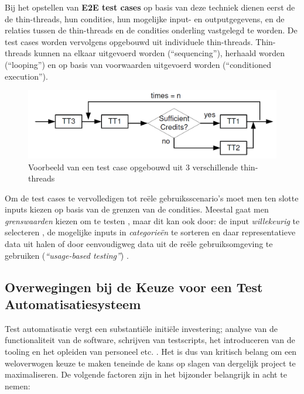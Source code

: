 Bij het opstellen van \textbf{E2E test cases} op basis van deze techniek dienen eerst de de thin-threads, hun condities, hun mogelijke input- en outputgegevens, en de relaties tussen de thin-threads en de condities onderling vastgelegd te worden. De test cases worden vervolgens opgebouwd uit individuele thin-threads. Thin-threads kunnen na elkaar uitgevoerd worden (``sequencing''), herhaald worden (``looping'') en op basis van voorwaarden uitgevoerd worden (``conditioned execution'').

\begin{figure}[h!]
    \centering
    \includegraphics[scale=0.35]{img/Tsai2001ComplexTestScenario.png}
    \caption{Voorbeeld van een test case opgebouwd uit 3 verschillende thin-threads ~\cite{Tsai2001}}
    \label{fig:tsaicomplexscenario}
\end{figure}

Om de test cases te vervolledigen tot reële gebruiksscenario's moet men ten slotte inputs kiezen op basis van de grenzen van de condities. Meestal gaat men \emph{grenswaarden} kiezen om te testen \autocite{Jorgensen2013}, maar dit kan ook door: de input \emph{willekeurig} te selecteren \autocite{Loo1988}, de mogelijke inputs in \emph{categorieën} te sorteren en daar representatieve data uit halen of door eenvoudigweg data uit de reële gebruiksomgeving te gebruiken (\emph{``usage-based testing''}) \autocite{Dyer1992}.

\subsection{Overwegingen bij de Keuze voor een Test Automatisatiesysteem}

Test automatisatie vergt een substantiële initiële investering; analyse van de functionaliteit van de software, schrijven van testscripts, het introduceren van de tooling en het opleiden van personeel etc. \autocite{Kumar2016}. Het is dus van kritisch belang om een weloverwogen keuze te maken teneinde de kans op slagen van dergelijk project te maximaliseren. De volgende factoren zijn in het bijzonder belangrijk in acht te nemen:

